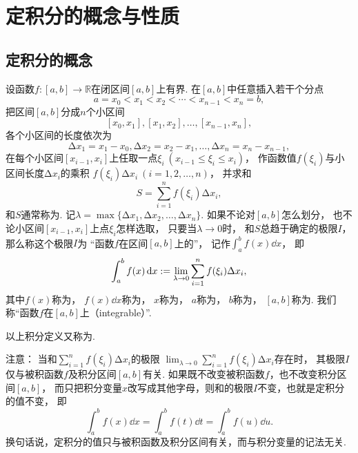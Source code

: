 \section{定积分的概念与性质}
\subsection{定积分的概念}
\begin{definition}
设函数\(f\colon[a,b]\to\mathbb{R}\)在闭区间\([a,b]\)上有界.
在\([a,b]\)中任意插入若干个分点\[
	a=x_0 < x_1 < x_2 < \dotsb < x_{n-1} < x_n = b,
\]
把区间\([a,b]\)分成\(n\)个小区间\[
	[x_0,x_1],[x_1,x_2],\dotsc,[x_{n-1},x_n],
\]
各个小区间的长度依次为\[
	\increment x_1=x_1-x_0,
	\increment x_2=x_2-x_1,
	\dotsc,
	\increment x_n=x_n-x_{n-1},
\]
在每个小区间\([x_{i-1},x_i]\)上任取一点\(\xi_i\ (x_{i-1} \leq \xi_i \leq x_i)\)，
作函数值\(f(\xi_i)\)与小区间长度\(\increment x_i\)的乘积
\(f(\xi_i)\increment x_i\ (i=1,2,\dotsc,n)\)，
并求和\[
	S = \sum_{i=1}^n f(\xi_i) \increment x_i,
\]
和\(S\)通常称为.
记\(\lambda=\max\{\increment x_1,\increment x_2,\dotsc,\increment x_n\}\).
如果不论对\([a,b]\)怎么划分，
也不论小区间\([x_{i-1},x_i]\)上点\(\xi_i\)怎样选取，
只要当\(\lambda\to0\)时，
和\(S\)总趋于确定的极限\(I\)，
那么称这个极限\(I\)为
“函数\(f\)在区间\([a,b]\)上的”，
记作\(\int_a^b f(x) \dd{x}\)，
即\begin{equation}
	\int_a^b f(x) \dd{x}
	:=
	\lim_{\lambda\to0} \sum_{i=1}^n f(\xi_i)\Delta x_i,
\end{equation}
其中\(f(x)\)称为，
\(f(x)\dd{x}\)称为，
\(x\)称为，
\(a\)称为，
\(b\)称为，
\([a,b]\)称为.
我们称“函数\(f\)在\([a,b]\)上（integrable）”.
\end{definition}
以上积分定义又称为.

注意：
当和\(\sum_{i=1}^n f(\xi_i) \increment x_i\)的极限
\(\lim_{\lambda\to0} \sum_{i=1}^n f(\xi_i) \increment x_i\)存在时，
其极限\(I\)仅与被积函数\(f\)及积分区间\([a,b]\)有关.
如果既不改变被积函数\(f\)，也不改变积分区间\([a,b]\)，
而只把积分变量\(x\)改写成其他字母，则和的极限\(I\)不变，也就是定积分的值不变，
即\[
	\int_a^b f(x) \dd{x}
	= \int_a^b f(t) \dd{t}
	= \int_a^b f(u) \dd{u}.
\]
换句话说，定积分的值只与被积函数及积分区间有关，而与积分变量的记法无关.

